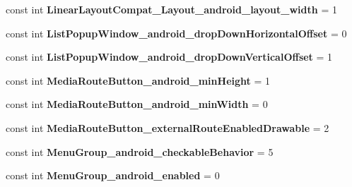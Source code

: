 \begin{DoxyCompactItemize}
const int {\bfseries Linear\+Layout\+Compat\+\_\+\+Layout\+\_\+android\+\_\+layout\+\_\+width} = 1
\item 
\mbox{\label{class_pinned_app_1_1_droid_1_1_resource_1_1_styleable_af6281e9464ef37aae20bd38dabaecd93}} 
const int {\bfseries List\+Popup\+Window\+\_\+android\+\_\+drop\+Down\+Horizontal\+Offset} = 0
\item 
\mbox{\label{class_pinned_app_1_1_droid_1_1_resource_1_1_styleable_a7823d648933fffc638d0c7b1d5ce12fe}} 
const int {\bfseries List\+Popup\+Window\+\_\+android\+\_\+drop\+Down\+Vertical\+Offset} = 1
\item 
\mbox{\label{class_pinned_app_1_1_droid_1_1_resource_1_1_styleable_a1923a23b0a06f4ea3c963e08cee8d5e8}} 
const int {\bfseries Media\+Route\+Button\+\_\+android\+\_\+min\+Height} = 1
\item 
\mbox{\label{class_pinned_app_1_1_droid_1_1_resource_1_1_styleable_a0e9c4e91147cfcd5ea65c86bbac21aea}} 
const int {\bfseries Media\+Route\+Button\+\_\+android\+\_\+min\+Width} = 0
\item 
\mbox{\label{class_pinned_app_1_1_droid_1_1_resource_1_1_styleable_a82d16dad9d53099c777b112bbce74355}} 
const int {\bfseries Media\+Route\+Button\+\_\+external\+Route\+Enabled\+Drawable} = 2
\item 
\mbox{\label{class_pinned_app_1_1_droid_1_1_resource_1_1_styleable_ac7fcbce61013e33233aa37f6fce753bc}} 
const int {\bfseries Menu\+Group\+\_\+android\+\_\+checkable\+Behavior} = 5
\item 
\mbox{\label{class_pinned_app_1_1_droid_1_1_resource_1_1_styleable_a4fb6936ad32fb849379941285eae8510}} 
const int {\bfseries Menu\+Group\+\_\+android\+\_\+enabled} = 0
\item 
\mbox{\label{class_pinned_app_1_1_droid_1_1_resource_1_1_styleable_a5f655ad885f4d974db33f0d0a170270c}} 

\end{DoxyCompactItemize}
